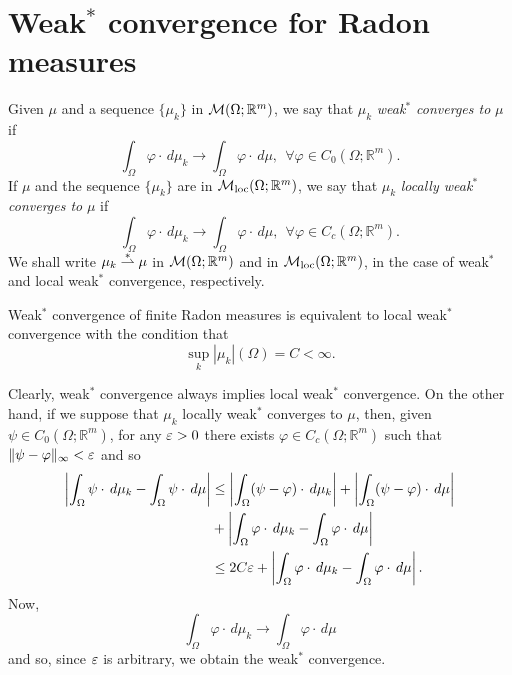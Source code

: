 \section{Weak$^{*}$ convergence for Radon measures}

\begin{definition} Given $\mu$ and a sequence $\{\mu_{k}\}$ in $\mathcal{M}(\Omega; \mathbb{R}^{m})$, we say that $\mu_{k}$ {\em weak$^{*}$ converges to} $\mu$ if
\[ \int_{\Omega} \varphi \cdot \, d\mu_{k} \to \int_{\Omega} \varphi \cdot \, d\mu, \    \   \forall \varphi \in C_{0}(\Omega; \mathbb{R}^{m}).   \]
If $\mu$ and the sequence $\{\mu_{k}\}$ are in $\mathcal{M}_{\rm loc}(\Omega; \mathbb{R}^{m})$, we say that $\mu_{k}$ {\em locally weak$^{*}$ converges to} $\mu$ if
\[ \int_{\Omega} \varphi \cdot \, d\mu_{k} \to \int_{\Omega} \varphi \cdot \, d\mu, \    \   \forall \varphi \in C_{c}(\Omega; \mathbb{R}^{m}).   \]
We shall write $\mu_{k} \overset{*}{\rightharpoonup} \mu$ in $\mathcal{M}(\Omega; \mathbb{R}^{m})$ and in $\mathcal{M}_{\rm loc}(\Omega; \mathbb{R}^{m})$, in the case of weak$^{*}$ and local weak$^{*}$ convergence, respectively.
\end{definition}

\begin{remark} \label{equivalenceweak-star} Weak$^{*}$ convergence of finite Radon measures is equivalent to local weak$^{*}$ convergence with the condition that $$\sup_{k} |\mu_{k}|(\Omega) = C < \infty.$$

Clearly, weak$^{*}$ convergence always implies local weak$^{*}$ convergence. 
On the other hand, if we suppose that $\mu_{k}$ locally weak$^{*}$ converges to $\mu$, then, given $\psi \in C_{0}(\Omega; \mathbb{R}^{m})$, for any $\varepsilon > 0$ there exists $\varphi \in C_{c}(\Omega; \mathbb{R}^{m})$ such that $\|\psi - \varphi\|_{\infty} < \varepsilon$ and so
\begin{align*} \left | \int_{\Omega} \psi \cdot \, d\mu_{k} - \int_{\Omega} \psi \cdot \, d\mu \right | & \le \left | \int_{\Omega} (\psi - \varphi) \cdot \, d\mu_{k} \right | + \left | \int_{\Omega} (\psi - \varphi) \cdot \, d\mu \right | \\
& + \left | \int_{\Omega} \varphi \cdot \, d\mu_{k} - \int_{\Omega} \varphi \cdot \, d\mu \right | \\
& \le 2 C \varepsilon + \left | \int_{\Omega} \varphi \cdot \, d\mu_{k} - \int_{\Omega} \varphi \cdot \, d\mu \right |.
\end{align*}
Now, $$\int_{\Omega} \varphi \cdot \, d\mu_{k} \to \int_{\Omega} \varphi \cdot \, d\mu$$ and so, since $\varepsilon$ is arbitrary, we obtain the weak$^{*}$ convergence.
\end{remark}

